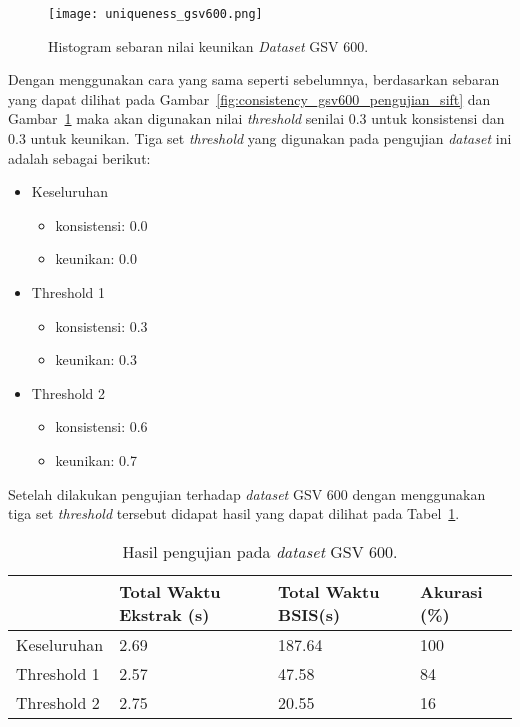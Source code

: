 \begin{figure}[H]
	\centering
	\texttt{[image: uniqueness\_gsv600.png]}
	\caption{Histogram sebaran nilai keunikan \textit{Dataset} GSV 600.}
	\label{fig:uniqueness_gsv600_pengujian_sift}
\end{figure}
Dengan menggunakan cara yang sama seperti sebelumnya, berdasarkan sebaran yang dapat dilihat pada Gambar~\ref{fig:consistency_gsv600_pengujian_sift} dan Gambar~\ref{fig:uniqueness_gsv600_pengujian_sift} maka akan digunakan nilai \textit{threshold} senilai 0.3 untuk konsistensi dan 0.3 untuk keunikan. Tiga set \textit{threshold} yang digunakan pada pengujian \textit{dataset} ini adalah sebagai berikut:
\begin{itemize}
	\item Keseluruhan
	\begin{itemize}
		\item konsistensi: 0.0
		\item keunikan: 0.0
	\end{itemize}
	\item Threshold 1
	\begin{itemize}
		\item konsistensi: 0.3
		\item keunikan: 0.3
	\end{itemize}
	\item Threshold 2
	\begin{itemize}
		\item konsistensi: 0.6
		\item keunikan: 0.7
	\end{itemize}
\end{itemize}
Setelah dilakukan pengujian terhadap \textit{dataset} GSV 600 dengan menggunakan tiga set \textit{threshold} tersebut didapat hasil yang dapat dilihat pada Tabel~\ref{tab:pengujian_sift_gsv600}.

\begin{table}[H]
	\centering
	\begin{tabular}{|l|l|l|l|}
		\hline
		& \textbf{Total Waktu Ekstrak (s)} & \textbf{Total Waktu BSIS(s)} & \textbf{Akurasi (\%)} \\ \hline
		Keseluruhan & 2.69 & 187.64                   & 100                    \\ \hline
		Threshold 1 & 2.57 & 47.58                    & 84                    \\ \hline
		Threshold 2 & 2.75 & 20.55                    & 16                    \\ \hline
	\end{tabular}
	\caption{Hasil pengujian pada \textit{dataset} GSV 600.}
	\label{tab:pengujian_sift_gsv600}
\end{table}


